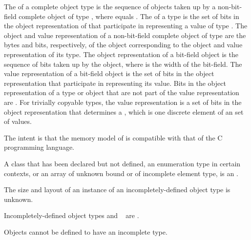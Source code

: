 \pnum
\label{term.object.representation}%
The 
of a complete object type  is the
sequence of   objects taken up
by a non-bit-field complete object of type ,
where  equals
.
The 
of a type  is the set of bits
in the object representation of 
that participate in representing a value of type .
The object and value representation of
a non-bit-field complete object of type  are
the bytes and bits, respectively, of
the object corresponding to the object and value representation of its type.
The object representation of a bit-field object is
the sequence of  bits taken up by the object,
where  is the width of the bit-field.
The value representation of a bit-field object is
the set of bits in the object representation that
participate in representing its value.
\label{term.padding.bits}%
Bits in the object representation of a type or object that are
not part of the value representation
are .
For trivially copyable types, the value representation is
a set of bits in the object representation that determines a
, which is one discrete element of an
 set of values.
\begin{footnote}
The intent is that the memory model of \Cpp{} is compatible
with that of the C programming language.
\end{footnote}

\pnum
{}%
A class that has been declared but not defined, an enumeration type in certain
contexts, or an array of unknown
bound or of incomplete element type, is an
.
\begin{footnote}
The size and layout of an instance of an incompletely-defined
object type is unknown.
\end{footnote}
\label{term.incomplete.type}%
Incompletely-defined object types and \cv{}~ are
.
\begin{note}
Objects cannot be defined to have an incomplete type.
\end{note}

